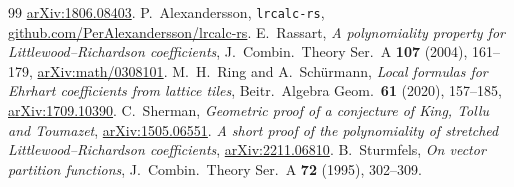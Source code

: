 \documentclass[11pt]{amsart}
\theoremstyle{definition}
\begin{document}
\begin{thebibliography}{99}
\href{https://arxiv.org/abs/1806.08403}{arXiv:1806.08403}.
 P.~Alexandersson, \texttt{lrcalc-rs},
\href{https://github.com/PerAlexandersson/lrcalc-rs}{github.com/PerAlexandersson/lrcalc-rs}.
 E.~Rassart, \emph{A polynomiality property for
Littlewood--Richardson coefficients}, J.\ Combin.\ Theory Ser.\ A \textbf{107}
(2004), 161--179, \href{https://arxiv.org/abs/math/0308101}{arXiv:math/0308101}.
 M.~H.~Ring and A.~Sch\"urmann, \emph{Local formulas for
Ehrhart coefficients from lattice tiles}, Beitr.\ Algebra Geom.\ \textbf{61}
(2020), 157--185, \href{https://arxiv.org/abs/1709.10390}{arXiv:1709.10390}.
 C.~Sherman, \emph{Geometric proof of a conjecture of King,
Tollu and Toumazet}, \href{https://arxiv.org/abs/1505.06551}{arXiv:1505.06551}.
 \emph{A short proof of the polynomiality of stretched
Littlewood--Richardson coefficients},
\href{https://arxiv.org/abs/2211.06810}{arXiv:2211.06810}.
 B.~Sturmfels, \emph{On vector partition functions},
J.\ Combin.\ Theory Ser.\ A \textbf{72} (1995), 302--309.
\end{thebibliography}
\end{document}
